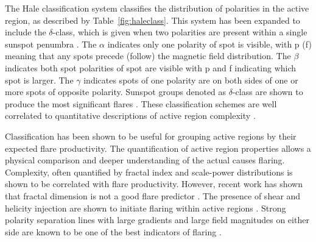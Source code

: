 The Hale classification system classifies the distribution of polarities in the active region, as described by Table~\ref{fig:haleclass}. This system has been expanded to include the $\delta$-class, which is given when two polarities are present within a single sunspot \gls{penumbra} \citep{Kunzel:1960}. The $\alpha$ indicates only one polarity of spot is visible, with p (f) meaning that any spots precede (follow) the magnetic field distribution. The $\beta$ indicates both spot polarities of spot are visible with p and f indicating which spot is larger. The $\gamma$ indicates spots of one polarity are on both sides of one or more spots of opposite polarity. Sunspot groups denoted as $\delta$-class are shown to produce the most significant flares \citep{sammis:2000}. These classification schemes are well correlated to quantitative descriptions of active region complexity \citep{ireland:2008}. 

\begin{table}[!t]
\caption[The possible sunspot group classifications using the Hale scheme.]{The possible sunspot group classifications using the Hale scheme \citep{Hale:1919} with the appended $\delta$-class \citep{Kunzel:1960}. The ``p" (``f") denote whether the strongest spot is preceding (following).}
\label{fig:haleclass}
\end{table}

Classification has been shown to be useful for grouping active regions by their expected flare productivity. The quantification of active region properties allows a physical comparison and deeper understanding of the actual causes flaring. Complexity, often quantified by fractal index \citep{mcateer:2005b,Conlon:2008,Conlon:2010a} and scale-power distributions \citep{Abramenko:2005,Hewett:2008} is shown to be correlated with flare productivity. However, recent work has shown that fractal dimension is not a good flare predictor \citep{georgoulis:2012}. 
The presence of shear and helicity injection are shown to initiate flaring within active regions \citep{Schrijver:2008a}.
Strong polarity separation lines with large gradients and large field magnitudes on either side are known to be one of the best indicators of flaring \citep{Schrijver:2007}.


